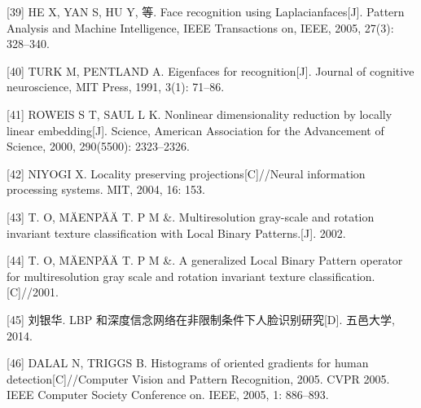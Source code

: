 \documentclass[bachelor,zhspacing]{cqu}  %
\begin{document}
\hypertarget{ref-he2005face}{}
{[}39{]} HE X, YAN S, HU Y, 等. Face recognition using
Laplacianfaces{[}J{]}. Pattern Analysis and Machine Intelligence, IEEE
Transactions on, IEEE, 2005, 27(3): 328--340.

\hypertarget{ref-turk1991eigenfaces}{}
{[}40{]} TURK M, PENTLAND A. Eigenfaces for recognition{[}J{]}. Journal
of cognitive neuroscience, MIT Press, 1991, 3(1): 71--86.

\hypertarget{ref-roweis2000nonlinear}{}
{[}41{]} ROWEIS S T, SAUL L K. Nonlinear dimensionality reduction by
locally linear embedding{[}J{]}. Science, American Association for the
Advancement of Science, 2000, 290(5500): 2323--2326.

\hypertarget{ref-niyogi2004locality}{}
{[}42{]} NIYOGI X. Locality preserving projections{[}C{]}//Neural
information processing systems. MIT, 2004, 16: 153.

\hypertarget{ref-mvg:94}{}
{[}43{]} T. O, MÄENPÄÄ T. P M \&. Multiresolution gray-scale and
rotation invariant texture classification with Local Binary
Patterns.{[}J{]}. 2002.

\hypertarget{ref-mvg:43}{}
{[}44{]} T. O, MÄENPÄÄ T. P M \&. A generalized Local Binary Pattern
operator for multiresolution gray scale and rotation invariant texture
classification.{[}C{]}//2001.

\hypertarget{ref-ux5218ux94f6ux534e2014lbp}{}
{[}45{]} 刘银华. LBP 和深度信念网络在非限制条件下人脸识别研究{[}D{]}.
五邑大学, 2014.

\hypertarget{ref-dalal2005histograms}{}
{[}46{]} DALAL N, TRIGGS B. Histograms of oriented gradients for human
detection{[}C{]}//Computer Vision and Pattern Recognition, 2005. CVPR
2005. IEEE Computer Society Conference on. IEEE, 2005, 1: 886--893.

%




\end{document}
